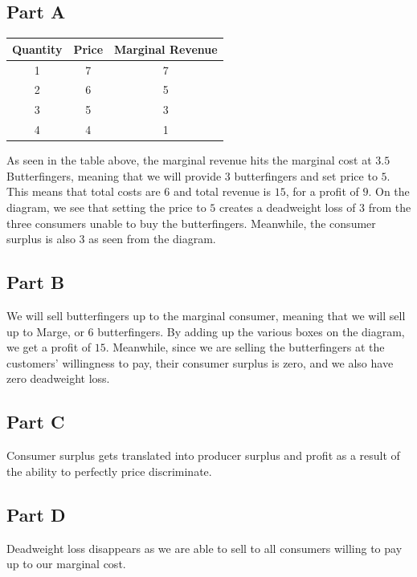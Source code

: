 \documentclass[8pt]{extarticle}
\begin{document}
{\subsection*{Part A}
\begin{center}
	\begin{tabular}{c|c|c}
	Quantity & Price & Marginal Revenue\\
	\hline
	1 & 7 & 7\\
	2 & 6 & 5\\
	3 & 5 & 3\\
	4 & 4 & 1\\
	\end{tabular}
\end{center}
As seen in the table above, the marginal revenue hits the marginal cost at $3.5$ Butterfingers, meaning that we will provide 3 butterfingers and set price to $5$. This means that total costs are $6$ and total revenue is $15$, for a profit of $9$. On the diagram, we see that setting the price to $5$ creates a deadweight loss of $3$ from the three consumers unable to buy the butterfingers. Meanwhile, the consumer surplus is also $3$ as seen from the diagram.
\subsection*{Part B}
We will sell butterfingers up to the marginal consumer, meaning that we will sell up to Marge, or $6$ butterfingers. By adding up the various boxes on the diagram, we get a profit of $15$. Meanwhile, since we are selling the butterfingers at the customers' willingness to pay, their consumer surplus is zero, and we also have zero deadweight loss.
\subsection*{Part C}
Consumer surplus gets translated into producer surplus and profit as a result of the ability to perfectly price discriminate.
\subsection*{Part D}
Deadweight loss disappears as we are able to sell to all consumers willing to pay up to our marginal cost.
}
\end{document}
